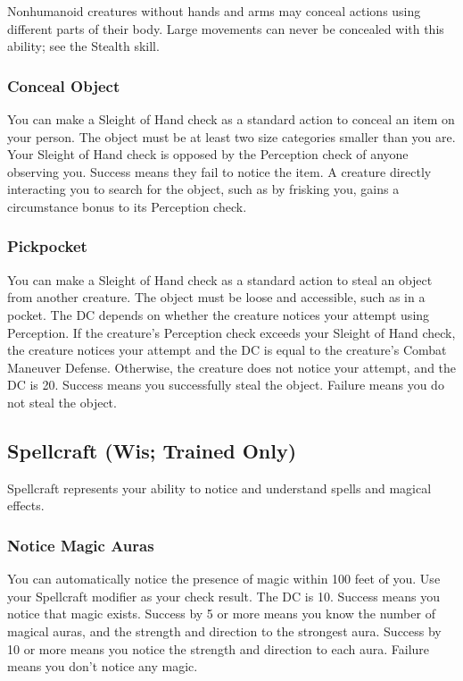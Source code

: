 Nonhumanoid creatures without hands and arms may conceal actions using different parts of their body. Large movements can never be concealed with this ability; see the Stealth skill.

\subsubsection{Conceal Object}
You can make a Sleight of Hand check as a standard action to conceal an item on your person. The object must be at least two size categories smaller than you are. Your Sleight of Hand check is opposed by the Perception check of anyone observing you. Success means they fail to notice the item. A creature directly interacting you to search for the object, such as by frisking you, gains a  circumstance bonus to its Perception check.

\subsubsection{Pickpocket}
You can make a Sleight of Hand check as a standard action to steal an object from another creature. The object must be loose and accessible, such as in a pocket. The DC depends on whether the creature notices your attempt using Perception. If the creature's Perception check exceeds your Sleight of Hand check, the creature notices your attempt and the DC is equal to the creature's Combat Maneuver Defense. Otherwise, the creature does not notice your attempt, and the DC is 20. Success means you successfully steal the object. Failure means you do not steal the object.

\subsection{Spellcraft (Wis; Trained Only)}
Spellcraft represents your ability to notice and understand spells and magical effects.

\subsubsection{Notice Magic Auras}
You can automatically notice the presence of magic within 100 feet of you. Use your Spellcraft modifier as your check result. The DC is 10. Success means you notice that magic exists. Success by 5 or more means you know the number of magical auras, and the strength and direction to the strongest aura. Success by 10 or more means you notice the strength and direction to each aura. Failure means you don't notice any magic.

